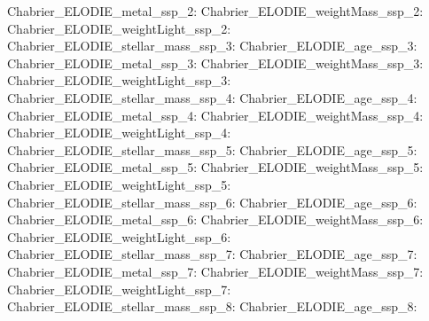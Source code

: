 Chabrier\_ELODIE\_metal\_ssp\_2:  \newline 
Chabrier\_ELODIE\_weightMass\_ssp\_2:  \newline 
Chabrier\_ELODIE\_weightLight\_ssp\_2:  \newline 
Chabrier\_ELODIE\_stellar\_mass\_ssp\_3:  \newline 
Chabrier\_ELODIE\_age\_ssp\_3:  \newline 
Chabrier\_ELODIE\_metal\_ssp\_3:  \newline 
Chabrier\_ELODIE\_weightMass\_ssp\_3:  \newline 
Chabrier\_ELODIE\_weightLight\_ssp\_3:  \newline 
Chabrier\_ELODIE\_stellar\_mass\_ssp\_4:  \newline 
Chabrier\_ELODIE\_age\_ssp\_4:  \newline 
Chabrier\_ELODIE\_metal\_ssp\_4:  \newline 
Chabrier\_ELODIE\_weightMass\_ssp\_4:  \newline 
Chabrier\_ELODIE\_weightLight\_ssp\_4:  \newline 
Chabrier\_ELODIE\_stellar\_mass\_ssp\_5:  \newline 
Chabrier\_ELODIE\_age\_ssp\_5:  \newline 
Chabrier\_ELODIE\_metal\_ssp\_5:  \newline 
Chabrier\_ELODIE\_weightMass\_ssp\_5:  \newline 
Chabrier\_ELODIE\_weightLight\_ssp\_5:  \newline 
Chabrier\_ELODIE\_stellar\_mass\_ssp\_6:  \newline 
Chabrier\_ELODIE\_age\_ssp\_6:  \newline 
Chabrier\_ELODIE\_metal\_ssp\_6:  \newline 
Chabrier\_ELODIE\_weightMass\_ssp\_6:  \newline 
Chabrier\_ELODIE\_weightLight\_ssp\_6:  \newline 
Chabrier\_ELODIE\_stellar\_mass\_ssp\_7:  \newline 
Chabrier\_ELODIE\_age\_ssp\_7:  \newline 
Chabrier\_ELODIE\_metal\_ssp\_7:  \newline 
Chabrier\_ELODIE\_weightMass\_ssp\_7:  \newline 
Chabrier\_ELODIE\_weightLight\_ssp\_7:  \newline 
Chabrier\_ELODIE\_stellar\_mass\_ssp\_8:  \newline 
Chabrier\_ELODIE\_age\_ssp\_8:  \newline 
